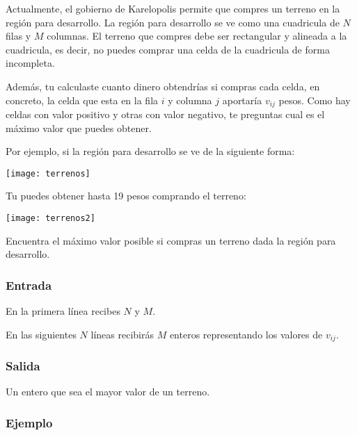 Actualmente, el gobierno de Karelopolis permite que compres un terreno en la región para desarrollo. La región para desarrollo se ve como una cuadricula de \(N\) filas y \(M\) columnas. El terreno que compres debe ser rectangular y alineada a la cuadricula, es decir, no puedes comprar una celda de la cuadricula de forma incompleta.

Además, tu calculaste cuanto dinero obtendrías si compras cada celda, en concreto, la celda que esta en la fila \(i\) y columna \(j\) aportaría \(v_{ij}\) pesos. Como hay celdas con valor positivo y otras con valor negativo, te preguntas cual es el máximo valor que puedes obtener.

Por ejemplo, si la región para desarrollo se ve de la siguiente forma:

\begin{center}
		\texttt{[image: terrenos]}
\end{center}

Tu puedes obtener hasta 19 pesos comprando el terreno:

\begin{center}
	\texttt{[image: terrenos2]}
\end{center}


Encuentra el máximo valor posible si compras un terreno dada la región para desarrollo.

\subsubsection*{Entrada}

En la primera línea recibes \(N\) y \(M\).

En las siguientes \(N\) líneas recibirás \(M\) enteros representando los valores de \(v_{ij}\).

\subsubsection*{Salida}

Un entero que sea el mayor valor de un terreno.

\subsubsection*{Ejemplo}

\begin{casebox2}
	\hline
\end{casebox2}

